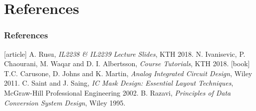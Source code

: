 \documentclass{beamer}
\begin{document}
  \section{References}
  \begin{frame}
    \frametitle{References}
    \begin{thebibliography}{9}
     [article]
     A. Rusu, {\textit{IL2238 \& IL2239 Lecture Slides}}, KTH 2018.
     N. Ivanisevic, P. Chaourani, M. Waqar and D. I. Albertsson, \textit{{Course Tutorials}}, KTH 2018.
     [book]
     T.C. Carusone, D. Johns and K. Martin, {\textit{Analog Integrated Circuit Design}}, Wiley 2011.
     C. Saint and J. Saing, {\textit{IC Mask Design: Essential Layout Techniques}}, McGraw-Hill Professional Engineering 2002.
     B. Razavi, \textit{Principles of Data Conversion System Design}, Wiley 1995.
    \end{thebibliography}
  \end{frame}
\end{document}
